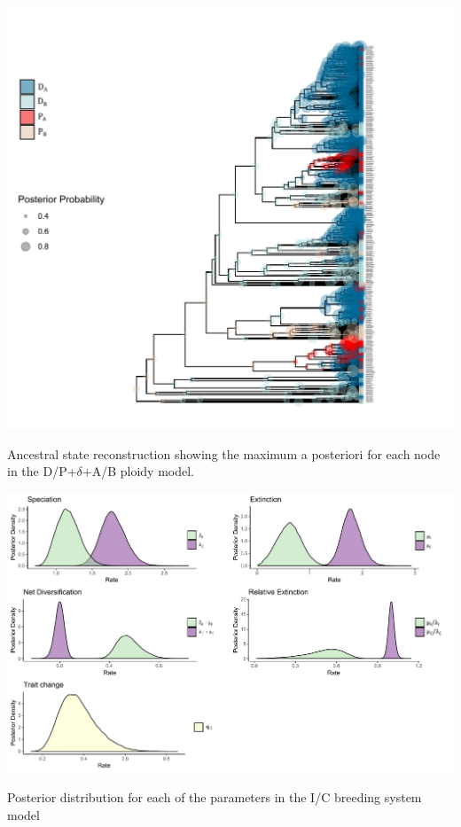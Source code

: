 \begin{suppfigure}
\includegraphics[width=\textwidth]{asrDPABdelta.pdf}
\caption{Ancestral state reconstruction showing the maximum a posteriori for each node in the D/P+$\delta$+A/B ploidy model.} %
\label{suppfigure:DPABasr}
\end{suppfigure}

\begin{suppfigure}
\includegraphics[width=\textwidth]{bisseSIposteriordist.pdf}
\caption{Posterior distribution for each of the parameters in the I/C breeding system model} %
\label{suppfigure:IC}
\end{suppfigure}

